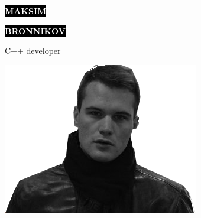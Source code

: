 \documentclass[9pt]{developercv} %
\begin{document}

\begin{minipage}[t]{0.55\textwidth} %
	\vspace{-\baselineskip} %
	
	\colorbox{black}{{\HUGE\textcolor{white}{\textbf{\MakeUppercase{Maksim}}}}} %
	
	\colorbox{black}{{\HUGE\textcolor{white}{\textbf{\MakeUppercase{Bronnikov}}}}} %
	
	\vspace{7pt}
	
	{\huge C++ developer} %
	
\end{minipage}
\begin{minipage}[t]{0.45\textwidth} %
	\vspace{-\baselineskip} %
	
	\hspace*{3.9cm}\includegraphics[scale = 0.39]{max.png}\\
	
\end{minipage}

\vspace{0.2cm}
\end{document}
